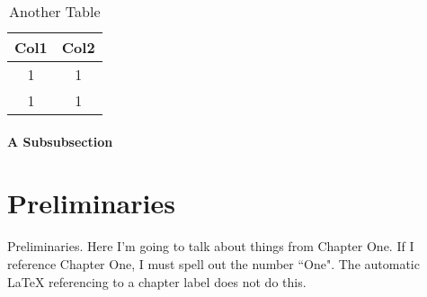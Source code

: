 \documentclass[12pt]{report} %
\numberwithin{equation}{subsection}
\numberwithin{figure}{chapter} %
\theoremstyle{numbernote}
\theoremstyle{nonumber}
\theoremstyle{nonumbernonote}
\theoremstyle{nonote}
\begin{document}
\begin{table}
    \caption{Another Table}
    \label{tab:my_label1}
    \centering
    \begin{tabular}{c|c}
        \hline
        Col1 & Col2\\
        \hline
        1 & 1 \\
        1 & 1 \\
        \hline
    \end{tabular}
\end{table}

\lipsum[1]

\subsubsection{A Subsubsection}

\lipsum[1]





\chapter{Preliminaries}

Preliminaries. Here I'm going to talk about things from Chapter One.  If I reference Chapter One, I must spell out the number ``One".  The automatic LaTeX referencing to a chapter label does not do this.
\end{document}
